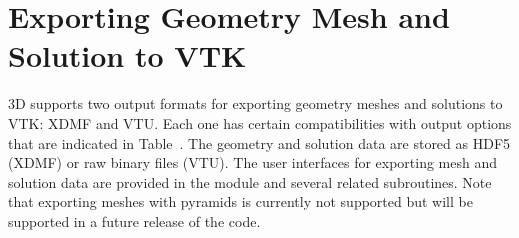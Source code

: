 \section{Exporting Geometry Mesh and Solution to VTK}
\label{sec:VTK}

\hp3D supports two output formats for exporting geometry meshes and solutions to VTK: XDMF and VTU. Each one has certain compatibilities with output options that are indicated in Table~. The geometry and solution data are stored as HDF5 (XDMF) or raw binary files (VTU). The user interfaces for exporting mesh and solution data are provided in the  module and several related subroutines. Note that exporting meshes with pyramids is currently not supported but will be supported in a future release of the code.

